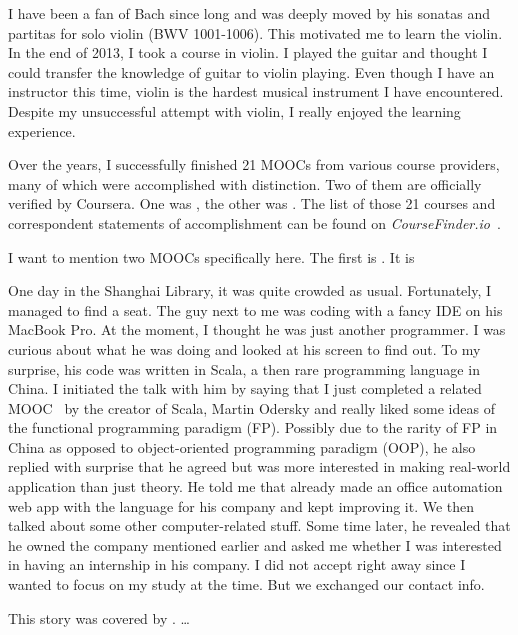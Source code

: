 	I have been a fan of Bach since long and was deeply moved by his sonatas and partitas for solo violin (BWV 1001-1006). This motivated me to learn the violin. In the end of 2013, I took a course in violin. I played the guitar and thought I could transfer the knowledge of guitar to violin playing. Even though I have an instructor this time, violin is the hardest musical instrument I have encountered. Despite my unsuccessful attempt with violin, I really enjoyed the learning experience.
	
	Over the years, I successfully finished 21 MOOCs from various course providers, many of which were accomplished with distinction. Two of them are officially verified by Coursera. One was , the other was . The list of those 21 courses and correspondent statements of accomplishment can be found on \textit{CourseFinder.io}~\cite{accredible}.
	
	I want to mention two MOOCs specifically here. The first is . It is 
	
	One day in the Shanghai Library, it was quite crowded as usual. Fortunately, I managed to find a seat. The guy next to me was coding with a fancy IDE on his MacBook Pro. At the moment, I thought he was just another programmer. I was curious about what he was doing and looked at his screen to find out. To my surprise, his code was written in Scala, a then rare programming language in China. I initiated the talk with him by saying that I just completed a related MOOC~\cite{FPPS} by the creator of Scala, Martin Odersky and really liked some ideas of the functional programming paradigm (FP). Possibly due to the rarity of FP in China as opposed to object-oriented programming paradigm (OOP), he also replied with surprise that he agreed but was more interested in making real-world application than just theory. He told me that already made an office automation web app with the language for his company and kept improving it. We then talked about some other computer-related stuff. Some time later, he revealed that he owned the company mentioned earlier and asked me whether I was interested in having an internship in his company. I did not accept right away since I wanted to focus on my study at the time. But we exchanged our contact info.
	
	This story was covered by . \dots %
	
